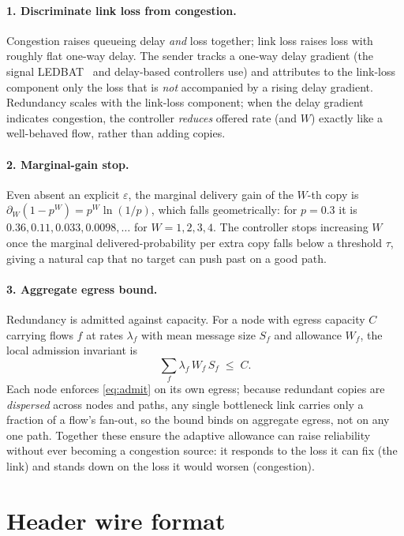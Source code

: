 \documentclass[10pt,twocolumn]{article}
\begin{document}
\paragraph{1. Discriminate link loss from congestion.}
Congestion raises queueing delay \emph{and} loss together; link loss raises loss
with roughly flat one-way delay. The sender tracks a one-way delay gradient (the
signal LEDBAT~\cite{ledbat} and delay-based controllers use) and attributes to
the link-loss component only the loss that is \emph{not} accompanied by a rising
delay gradient. Redundancy scales with the link-loss component; when the delay
gradient indicates congestion, the controller \emph{reduces} offered rate (and
$W$) exactly like a well-behaved flow, rather than adding copies.

\paragraph{2. Marginal-gain stop.}
Even absent an explicit $\varepsilon$, the marginal delivery gain of the $W$-th
copy is $\partial_W(1-p^{W})=p^{W}\ln(1/p)$, which falls geometrically: for
$p{=}0.3$ it is $0.36,0.11,0.033,0.0098,\dots$ for $W{=}1,2,3,4$. The controller
stops increasing $W$ once the marginal delivered-probability per extra copy falls
below a threshold $\tau$, giving a natural cap that no target can push past on a
good path.

\paragraph{3. Aggregate egress bound.}
Redundancy is admitted against capacity. For a node with egress capacity $C$
carrying flows $f$ at rates $\lambda_f$ with mean message size $S_f$ and
allowance $W_f$, the local admission invariant is
\begin{equation}
  \sum_f \lambda_f\,W_f\,S_f \;\le\; C. \label{eq:admit}
\end{equation}
Each node enforces \eqref{eq:admit} on its own egress; because redundant copies
are \emph{dispersed} across nodes and paths, any single bottleneck link carries
only a fraction of a flow's fan-out, so the bound binds on aggregate egress, not
on any one path. Together these ensure the adaptive allowance can raise
reliability without ever becoming a congestion source: it responds to the loss it
can fix (the link) and stands down on the loss it would worsen (congestion).

\section{Header wire format}\label{sec:header}
\end{document}
